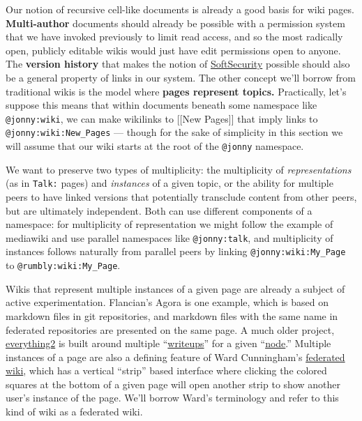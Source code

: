 Our notion of recursive cell-like documents is already a good basis for
wiki pages. \textbf{Multi-author} documents should already be possible
with a permission system that we have invoked previously to limit read
access, and so the most radically open, publicly editable wikis would
just have edit permissions open to anyone. The \textbf{version history}
that makes the notion of
\href{http://meatballwiki.org/wiki/SoftSecurity}{SoftSecurity} possible
should also be a general property of links in our system. The other
concept we'll borrow from traditional wikis is the model where
\textbf{pages represent topics.} Practically, let's suppose this means
that within documents beneath some namespace like \texttt{@jonny:wiki},
we can make wikilinks to {[}{[}New Pages{]}{]} that imply links to
\texttt{@jonny:wiki:New\_Pages} --- though for the sake of simplicity in
this section we will assume that our wiki starts at the root of the
\texttt{@jonny} namespace.

We want to preserve two types of multiplicity: the multiplicity of
\emph{representations} (as in \texttt{Talk:} pages) and \emph{instances}
of a given topic, or the ability for multiple peers to have linked
versions that potentially transclude content from other peers, but are
ultimately independent. Both can use different components of a
namespace: for multiplicity of representation we might follow the
example of mediawiki and use parallel namespaces like
\texttt{@jonny:talk}, and multiplicity of instances follows naturally
from parallel peers by linking \texttt{@jonny:wiki:My\_Page} to
\texttt{@rumbly:wiki:My\_Page}.

Wikis that represent multiple instances of a given page are already a
subject of active experimentation. Flancian's Agora is one example,
which is based on markdown files in git repositories, and markdown files
with the same name in federated repositories are presented on the same
page. A much older project, \href{https://everything2.com/}{everything2} is
built around multiple
``\href{https://everything2.com/title/Writeup}{writeups}'' for a given
``\href{https://everything2.com/title/Node}{node}.'' Multiple instances
of a page are also a defining feature of Ward Cunningham's
\href{http://ward.fed.wiki.org/view/welcome-visitors/view/home-in-the-federation}{federated
wiki}, which has a vertical ``strip'' based interface where clicking the
colored squares at the bottom of a given page will open another strip to
show another user's instance of the page. We'll borrow Ward's
terminology and refer to this kind of wiki as a federated wiki.

